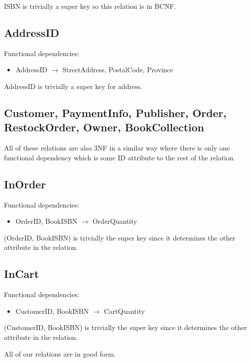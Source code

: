 \documentclass{article}
\newcommand{\trightarrow}{\(\rightarrow\)}
\begin{document}
ISBN is trivially a super key so this relation is in BCNF.

\subsection{AddressID}
Functional dependencies:
\begin{itemize}
  \item AddressID \trightarrow{} StreetAddress, PostalCode, Province
\end{itemize}

AddressID is trivially a super key for address.

\subsection{Customer, PaymentInfo, Publisher, Order, RestockOrder, Owner, BookCollection}
All of these relations are also 3NF in a similar way where there is only one functional dependency which is some ID attribute to the rest of the relation.

\subsection{InOrder}
Functional dependencies:
\begin{itemize}
  \item OrderID, BookISBN \trightarrow{} OrderQuantity
\end{itemize}

(OrderID, BookISBN) is trivially the super key since it determines the other attribute in the relation.

\subsection{InCart}
Functional dependencies:
\begin{itemize}
  \item CustomerID, BookISBN \trightarrow{} CartQuantity
\end{itemize}

(CustomerID, BookISBN) is trivially the super key since it determines the other attribute in the relation.

All of our relations are in good form.
\end{document}
